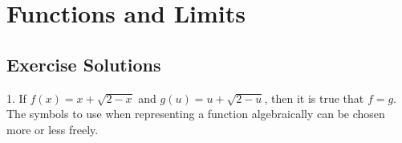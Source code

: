 \documentclass[10pt]{article}
\begin{document}
\section{Functions and Limits}
\subsection{Exercise Solutions}

1. If \(f(x) = x + \sqrt{2 - x}\) and \(g(u) = u + \sqrt{2 - u}\), then it is true that \(f = g\). The symbols to use when representing a function algebraically can be chosen more or less freely.
\end{document}
